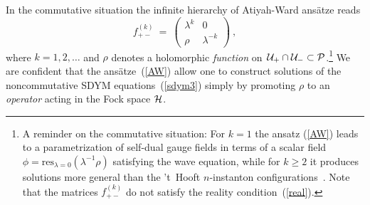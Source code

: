 \documentclass[a4paper,11pt]{article}
\numberwithin{equation}{section}
\def\l{\lambda}
\def\r{\rho}
\newcommand{\Hcal}{{\cal H}}
\newcommand{\Pcal}{{\cal P}}
\newcommand{\U}{{\cal U}}
\begin{document}
In the commutative situation the infinite hierarchy of 
Atiyah-Ward ans\"atze reads
\begin{equation}\label{AW}
f^{(k)}_{+-}\ =\ \begin{pmatrix} \l^k & 0 \\ \r & \l^{-k} \end{pmatrix}\ ,
\end{equation}
where $k=1,2,\ldots$ and $\r$ denotes a holomorphic {\it function\/}
on~$\U_+\cap\U_-\subset \Pcal$.\footnote{
A reminder on the commutative situation:
{}For $k{=}1$ the ansatz (\ref{AW}) leads to a parametrization of
self-dual gauge fields in terms of a scalar field
$\phi = \textrm{res}_{\l =0} (\l^{-1}\r )$ satisfying the wave equation,
while for $k{\ge}2$ it produces solutions more general than
the 't~Hooft $n$-instanton
configurations~\cite{Atiyah:1977pw,Corrigan:1978ma,Prasad:1980yy,Ward:1981kj}.
Note that the matrices $f^{(k)}_{+-}$ do not
satisfy the reality condition~(\ref{real}).
}
We are confident that 
the ans\"atze~(\ref{AW}) allow one to construct solutions of the
noncommutative SDYM equations~(\ref{sdym3}) simply by promoting $\r$ to an 
{\it operator\/} acting in the Fock space $\Hcal$.  
\end{document}
